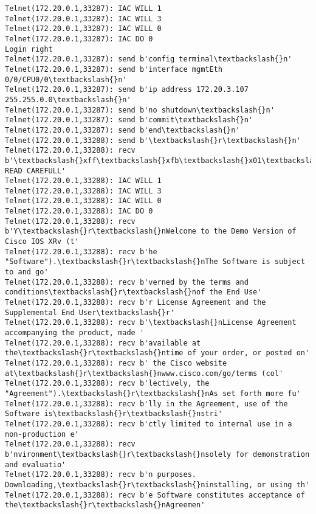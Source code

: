 \documentclass[11pt]{article}
\begin{document}
\begin{Verbatim}[commandchars=\\\{\}]
Telnet(172.20.0.1,33287): IAC WILL 1
Telnet(172.20.0.1,33287): IAC WILL 3
Telnet(172.20.0.1,33287): IAC WILL 0
Telnet(172.20.0.1,33287): IAC DO 0
Login right
Telnet(172.20.0.1,33287): send b'config terminal\textbackslash{}n'
Telnet(172.20.0.1,33287): send b'interface mgmtEth 0/0/CPU0/0\textbackslash{}n'
Telnet(172.20.0.1,33287): send b'ip address 172.20.3.107 255.255.0.0\textbackslash{}n'
Telnet(172.20.0.1,33287): send b'no shutdown\textbackslash{}n'
Telnet(172.20.0.1,33287): send b'commit\textbackslash{}n'
Telnet(172.20.0.1,33287): send b'end\textbackslash{}n'
Telnet(172.20.0.1,33288): send b'\textbackslash{}r\textbackslash{}n'
Telnet(172.20.0.1,33288): recv b'\textbackslash{}xff\textbackslash{}xfb\textbackslash{}x01\textbackslash{}xff\textbackslash{}xfb\textbackslash{}x03\textbackslash{}xff\textbackslash{}xfb\textbackslash{}x00\textbackslash{}xff\textbackslash{}xfd\textbackslash{}x00\textbackslash{}x1b]0;xrv8\textbackslash{}x07\textbackslash{}r\textbackslash{}n\textbackslash{}r\textbackslash{}nIMPORTANT:  READ CAREFULL'
Telnet(172.20.0.1,33288): IAC WILL 1
Telnet(172.20.0.1,33288): IAC WILL 3
Telnet(172.20.0.1,33288): IAC WILL 0
Telnet(172.20.0.1,33288): IAC DO 0
Telnet(172.20.0.1,33288): recv b'Y\textbackslash{}r\textbackslash{}nWelcome to the Demo Version of Cisco IOS XRv (t'
Telnet(172.20.0.1,33288): recv b'he "Software").\textbackslash{}r\textbackslash{}nThe Software is subject to and go'
Telnet(172.20.0.1,33288): recv b'verned by the terms and conditions\textbackslash{}r\textbackslash{}nof the End Use'
Telnet(172.20.0.1,33288): recv b'r License Agreement and the Supplemental End User\textbackslash{}r'
Telnet(172.20.0.1,33288): recv b'\textbackslash{}nLicense Agreement accompanying the product, made '
Telnet(172.20.0.1,33288): recv b'available at the\textbackslash{}r\textbackslash{}ntime of your order, or posted on'
Telnet(172.20.0.1,33288): recv b' the Cisco website at\textbackslash{}r\textbackslash{}nwww.cisco.com/go/terms (col'
Telnet(172.20.0.1,33288): recv b'lectively, the "Agreement").\textbackslash{}r\textbackslash{}nAs set forth more fu'
Telnet(172.20.0.1,33288): recv b'lly in the Agreement, use of the Software is\textbackslash{}r\textbackslash{}nstri'
Telnet(172.20.0.1,33288): recv b'ctly limited to internal use in a non-production e'
Telnet(172.20.0.1,33288): recv b'nvironment\textbackslash{}r\textbackslash{}nsolely for demonstration and evaluatio'
Telnet(172.20.0.1,33288): recv b'n purposes.  Downloading,\textbackslash{}r\textbackslash{}ninstalling, or using th'
Telnet(172.20.0.1,33288): recv b'e Software constitutes acceptance of the\textbackslash{}r\textbackslash{}nAgreemen'

\end{Verbatim}
\end{document}
